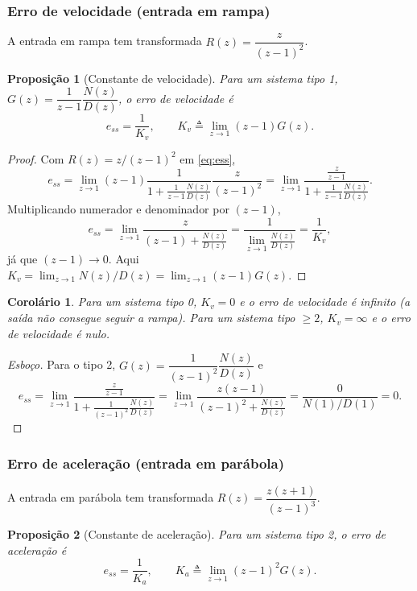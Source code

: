 \documentclass[11pt,a4paper,oneside]{book}
\theoremstyle{definition}
\theoremstyle{plain}
\newtheorem{proposicao}{Proposição}[chapter]
\newtheorem{corolario}{Corolário}[chapter]
\begin{document}
\subsubsection{Erro de velocidade (entrada em rampa)}

A entrada em rampa tem transformada $R(z)=\dfrac{z}{(z-1)^2}$.

\begin{proposicao}[Constante de velocidade]
\label{prop:Kv}
Para um sistema tipo 1, $G(z)=\dfrac{1}{z-1}\dfrac{N(z)}{D(z)}$, o erro de
velocidade é
\begin{equation}
    e_{ss}=\frac{1}{K_v},\qquad
    K_v\triangleq\lim_{z\to 1}(z-1)G(z).
    \label{eq:Kv}
\end{equation}
\end{proposicao}

\begin{proof}
Com $R(z)=z/(z-1)^2$ em \eqref{eq:ess},
\[
e_{ss}=\lim_{z\to1}(z-1)\frac{1}{1+\frac{1}{z-1}\frac{N(z)}{D(z)}}\frac{z}{(z-1)^2}
      =\lim_{z\to1}\frac{\frac{z}{z-1}}{1+\frac{1}{z-1}\frac{N(z)}{D(z)}}.
\]
Multiplicando numerador e denominador por $(z-1)$,
\[
e_{ss}=\lim_{z\to1}\frac{z}{(z-1)+\frac{N(z)}{D(z)}}
      =\frac{1}{\lim_{z\to1}\frac{N(z)}{D(z)}}
      =\frac{1}{K_v},
\]
já que $(z-1)\to 0$. Aqui $K_v=\lim_{z\to1}N(z)/D(z)=\lim_{z\to1}(z-1)G(z)$.
\end{proof}

\begin{corolario}
Para um sistema tipo 0, $K_v=0$ e o erro de velocidade é infinito (a saída não
consegue seguir a rampa). Para um sistema tipo $\ge 2$, $K_v=\infty$ e o erro de
velocidade é nulo.
\end{corolario}

\begin{proof}[Esboço]
Para o tipo 2, $G(z)=\dfrac{1}{(z-1)^2}\dfrac{N(z)}{D(z)}$ e
\[
e_{ss}=\lim_{z\to1}\frac{\frac{z}{z-1}}{1+\frac{1}{(z-1)^2}\frac{N(z)}{D(z)}}
      =\lim_{z\to1}\frac{z(z-1)}{(z-1)^2+\frac{N(z)}{D(z)}}
      =\frac{0}{N(1)/D(1)}=0.
\]
\end{proof}

\subsubsection{Erro de aceleração (entrada em parábola)}

A entrada em parábola tem transformada $R(z)=\dfrac{z(z+1)}{(z-1)^3}$.

\begin{proposicao}[Constante de aceleração]
\label{prop:Ka}
Para um sistema tipo 2, o erro de aceleração é
\begin{equation}
    e_{ss}=\frac{1}{K_a},\qquad
    K_a\triangleq\lim_{z\to 1}(z-1)^2 G(z).
    \label{eq:Ka}
\end{equation}
\end{proposicao}
\end{document}
